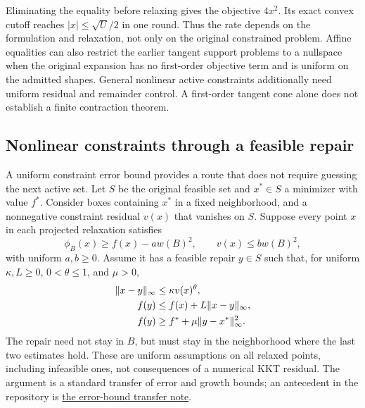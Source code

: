 Eliminating the equality before relaxing gives the objective $4x^2$.
Its exact convex cutoff reaches $|x|\le\sqrt U/2$ in one round.
Thus the rate depends on the formulation and relaxation, not only on
the original constrained problem. Affine equalities can also restrict
the earlier tangent support problems to a nullspace when the original
expansion has no first-order objective term and is uniform on the
admitted shapes. General nonlinear active constraints additionally need
uniform residual and remainder control. A first-order tangent cone
alone does not establish a finite contraction theorem.

\subsection{Nonlinear constraints through a feasible repair}

A uniform constraint error bound provides a route that does not require
guessing the next active set. Let $S$ be the original feasible set and
$x^*\in S$ a minimizer with value $f^*$. Consider boxes containing
$x^*$ in a fixed neighborhood, and a nonnegative constraint residual
$v(x)$ that vanishes on $S$. Suppose every point $x$ in each projected
relaxation satisfies
\begin{equation}\label{eq:repair-data}
 \phi_B(x)\ge f(x)-a w(B)^2,\qquad v(x)\le b w(B)^2,
\end{equation}
with uniform $a,b\ge0$. Assume it has a feasible repair $y\in S$ such
that, for uniform $\kappa,L\ge0$, $0<\theta\le1$, and $\mu>0$,
\begin{align}
 \lVert x-y\rVert_\infty&\le\kappa v(x)^\theta,\label{eq:repair-distance}\\
 f(y)&\le f(x)+L\lVert x-y\rVert_\infty,\label{eq:repair-lipschitz}\\
 f(y)&\ge f^*+\mu\lVert y-x^*\rVert_\infty^2.\label{eq:repair-growth}
\end{align}
The repair need not stay in $B$, but must stay in the neighborhood where
the last two estimates hold. These are uniform assumptions on all relaxed
points, including infeasible ones, not consequences of a numerical KKT
residual. The argument is a standard transfer of error and growth bounds;
an antecedent in the repository is
\href{run:../../notes/research-20260922-error-bound-transfer.md}{the error-bound transfer note}.

